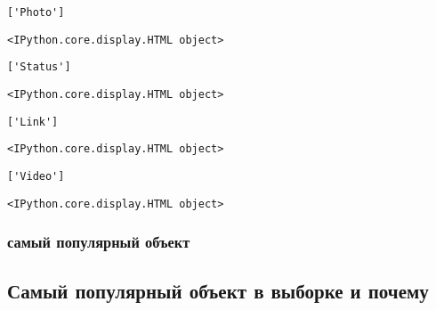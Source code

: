 \documentclass[11pt]{article}
\begin{document}
    \begin{Verbatim}[commandchars=\\\{\}]
['Photo']

    \end{Verbatim}

    
    \begin{verbatim}
<IPython.core.display.HTML object>
    \end{verbatim}

    
    \begin{Verbatim}[commandchars=\\\{\}]
['Status']

    \end{Verbatim}

    
    \begin{verbatim}
<IPython.core.display.HTML object>
    \end{verbatim}

    
    \begin{Verbatim}[commandchars=\\\{\}]
['Link']

    \end{Verbatim}

    
    \begin{verbatim}
<IPython.core.display.HTML object>
    \end{verbatim}

    
    \begin{Verbatim}[commandchars=\\\{\}]
['Video']

    \end{Verbatim}

    
    \begin{verbatim}
<IPython.core.display.HTML object>
    \end{verbatim}

    
    \subsubsection{самый популярный
объект}\label{ux441ux430ux43cux44bux439-ux43fux43eux43fux443ux43bux44fux440ux43dux44bux439-ux43eux431ux44aux435ux43aux442}

    \subsection{Самый популярный объект в выборке и
почему}\label{ux441ux430ux43cux44bux439-ux43fux43eux43fux443ux43bux44fux440ux43dux44bux439-ux43eux431ux44aux435ux43aux442-ux432-ux432ux44bux431ux43eux440ux43aux435-ux438-ux43fux43eux447ux435ux43cux443}
\end{document}
